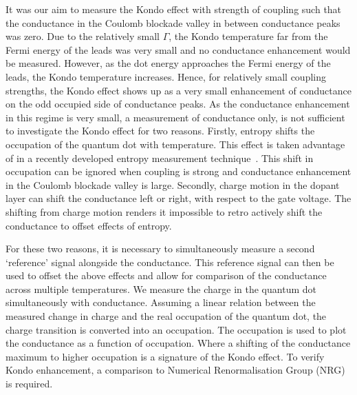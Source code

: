 It was our aim to measure the Kondo effect with strength of coupling such that the conductance in the Coulomb blockade valley in between conductance peaks was zero. Due to the relatively small $\Gamma$, the Kondo temperature far from the Fermi energy of the leads was very small and no conductance enhancement would be measured. However, as the dot energy approaches the Fermi energy of the leads, the Kondo temperature increases. Hence, for relatively small coupling strengths, the Kondo effect shows up as a very small enhancement of conductance on the odd occupied side of conductance peaks. As the conductance enhancement in this regime is very small, a measurement of conductance only, is not sufficient to investigate the Kondo effect for two reasons. Firstly, entropy shifts the occupation of the quantum dot with temperature. This effect is taken advantage of in a recently developed entropy measurement technique~\cite{hartman, child_strong, child_meas}. This shift in occupation can be ignored when coupling is strong and conductance enhancement in the Coulomb blockade valley is large. Secondly, charge motion in the dopant layer can shift the conductance left or right, with respect to the gate voltage. The shifting from charge motion renders it impossible to retro actively shift the conductance to offset effects of entropy. 

For these two reasons, it is necessary to simultaneously measure a second `reference' signal alongside the conductance. This reference signal can then be used to offset the above effects and allow for comparison of the conductance across multiple temperatures. We measure the charge in the quantum dot simultaneously with conductance. Assuming a linear relation between the measured change in charge and the real occupation of the quantum dot, the charge transition is converted into an occupation. The occupation is used to plot the conductance as a function of occupation. Where a shifting of the conductance maximum to higher occupation is a signature of the Kondo effect. To verify Kondo enhancement, a comparison to Numerical Renormalisation Group (NRG) is required. 




